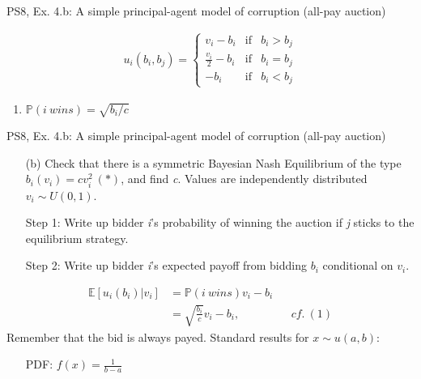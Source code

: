 \begin{frame}{PS8, Ex. 4.b: A simple principal-agent model of corruption (all-pay auction)}
\begin{multicols}{2}
\begin{align*}
        u_i(b_i,b_j)=\left\{\begin{array}{lcl}
          v_i-b_i           & \text{if} & b_i>b_j \\
          \frac{v_i}{2}-b_i & \text{if} & b_i=b_j \\
          -b_i              & \text{if} & b_i<b_j
        \end{array}\right.
      \end{align*} \vspace{-16pt}
      \begin{enumerate}
        \item $\mathbb{P}(i\ wins)=\sqrt{b_i/c}$
      \end{enumerate}
      \vfill\null
    \end{multicols}
\end{frame}
\begin{frame}{PS8, Ex. 4.b: A simple principal-agent model of corruption (all-pay auction)}
    \begin{itemize}
      \item[(b)] Check that there is a symmetric Bayesian Nash Equilibrium of the type $b_i(v_i) = cv_i^2\ (*)$, and find \textit{c}. Values are independently distributed $v_i\sim U(0, 1)$.
    \end{itemize} \vspace{-8pt}
    \begin{multicols}{2}
      \begin{itemize}
        \item[Step 1:] Write up bidder \textit{i}'s probability of winning the auction if \textit{j} sticks to the equilibrium strategy.
        \item[Step 2:] Write up bidder \textit{i}'s expected payoff from bidding $b_i$ conditional on $v_i$.
      \end{itemize} \vspace{-8pt}
      \begin{align*}
        \mathbb{E}[u_i(b_i)|v_i]&=\mathbb{P}(i\ wins)v_i-b_i\\
                           &=\sqrt{\frac{b_i}{c}}v_i-b_i,&&cf.\ (1)
      \end{align*} \vspace{-8pt}
      Remember that the bid is always payed.
      \vfill\null\columnbreak
      Standard results for $x\sim u(a, b):$ \vspace{-6pt}
      \begin{itemize}
        \item[PDF:] $f(x)=\frac{1}{b-a}$

\end{itemize}
\end{multicols}
\end{frame}
